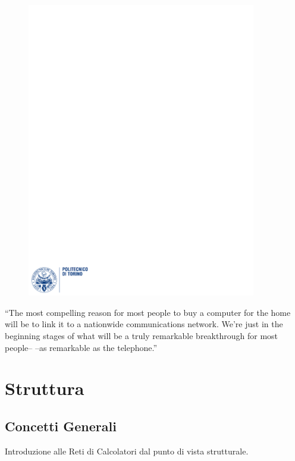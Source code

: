 \documentclass[12pt]{article}
\begin{document}
\begin{figure}
  \centering
  \includegraphics[width=10cm]{images/polito.pdf}
\end{figure}

\maketitle
\newpage
\tableofcontents
\newpage
``The most compelling reason for most people to buy a computer for the home will be to link it to a nationwide communications network. We’re just in the beginning stages of what will be a truly remarkable breakthrough for most people– –as remarkable as the telephone.''\\
\newpage
\section{Struttura}
\subsection{Concetti Generali}\label{subsubsec}
Introduzione alle Reti di Calcolatori dal punto di vista strutturale.
\end{document}
